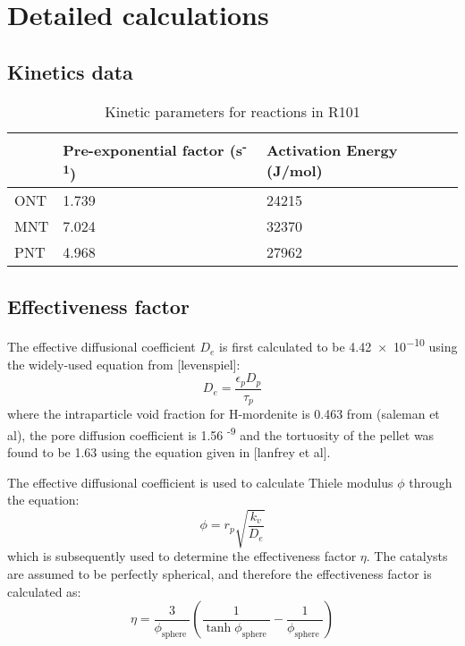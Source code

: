 \section{Detailed calculations}
\label{app:reaction}
\subsection{Kinetics data}

\begin{table}[h]
\centering
\caption{Kinetic parameters for reactions in R101}
\label{tab:R1-kinetic-params}
\begin{tabular}{@{}lll@{}}
\toprule
 & Pre-exponential factor (s\textsuperscript{-1}) & Activation Energy (J/mol) \\ \midrule
ONT & 1.739 & 24215 \\
MNT & 7.024 & 32370 \\
PNT & 4.968 & 27962 \\ \bottomrule
\end{tabular}
\end{table}

\subsection{Effectiveness factor}

The effective diffusional coefficient $D_e$ is first calculated to be \num{4.42e-10} using the widely-used equation from [levenspiel]: 
\begin{equation}
    D_e = \frac{\epsilon_p D_p}{\tau_p}
\end{equation}
where the intraparticle void fraction for H-mordenite is 0.463 from (saleman et al), the pore diffusion coefficient is 1.56 \textsuperscript{-9} and the tortuosity of the pellet was found to be 1.63 using the equation given in [lanfrey et al]. 

The effective diffusional coefficient is used to calculate Thiele modulus $\phi$ through the equation:
\begin{equation}
    \phi = r_p \sqrt{\frac{k_v}{D_e}}
\end{equation}
which is subsequently used to determine the effectiveness factor $\eta$. The catalysts are assumed to be perfectly spherical, and therefore the effectiveness factor is calculated as: 
\begin{equation}
\eta=\frac{3}{\phi_{\text {sphere }}}\left(\frac{1}{\tanh \phi_{\text {sphere }}}-\frac{1}{\phi_{\text {sphere }}}\right)
\end{equation}

